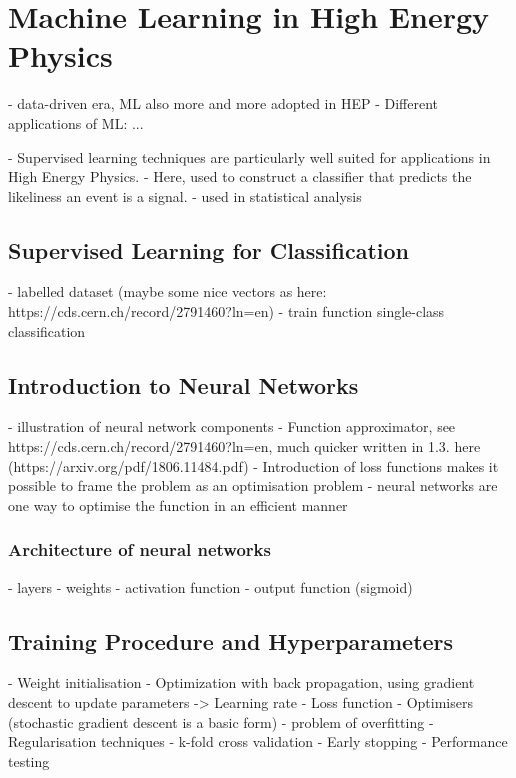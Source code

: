 



\chapter{Machine Learning in High Energy Physics}
\label{chap:ml}

- data-driven era, ML also more and more adopted in HEP
- Different applications of ML: ...

- Supervised learning techniques are particularly well suited for applications in High Energy Physics.
- Here, used to construct a classifier that predicts the likeliness an event is a signal. 
- used in statistical analysis 

\section{Supervised Learning for Classification}
- labelled dataset (maybe some nice vectors as here: https://cds.cern.ch/record/2791460?ln=en)
- train function single-class classification

\section{Introduction to Neural Networks}
- illustration of neural network components
- Function approximator, see https://cds.cern.ch/record/2791460?ln=en, much quicker written in 1.3. here (https://arxiv.org/pdf/1806.11484.pdf)
    - Introduction of loss functions makes it possible to frame the problem as an optimisation problem 
    - neural networks are one way to optimise the function in an efficient manner


\subsection{Architecture of neural networks}
- layers
- weights
- activation function
- output function (sigmoid)

\section{Training Procedure and Hyperparameters}
- Weight initialisation
- Optimization with back propagation, using gradient descent to update parameters
    -> Learning rate
- Loss function
- Optimisers (stochastic gradient descent is a basic form)
- problem of overfitting
    - Regularisation techniques
    - k-fold cross validation
- Early stopping
- Performance testing

